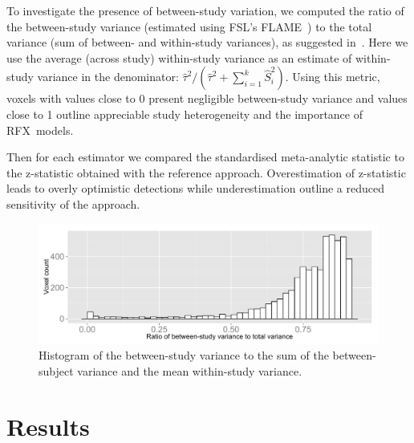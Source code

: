 \documentclass{llncs}
\newcommand{\vareffect}[1][i]{\hat S^2_{#1}}
\newcommand{\nStudies}{k}
\newcommand{\estvarBetween}{\hat\tau^2}
\begin{document}




To investigate the presence of between-study variation, we computed the ratio of the between-study variance (estimated using FSL's FLAME~\cite{Smith2001}) to the total variance (sum of between- and within-study variances), as suggested in~\cite{Chen2012}. Here we use the average (across study) within-study variance as an estimate of within-study variance in the denominator:
$\estvarBetween / (\estvarBetween + \sum_{i=1}^{\nStudies} \vareffect)$.
Using this metric, voxels with values close to 0 present negligible between-study variance and values close to 1 outline appreciable study heterogeneity and the importance of RFX~models.

Then for each estimator we co{}mpared the standardised meta-analytic statistic to the z-statistic obtained with the reference approach. Overestimation of z-statistic leads to overly optimistic detections while underestimation outline a reduced sensitivity of the approach. 

\begin{figure}[t]
	\centering
	\includegraphics[width=0.7\linewidth]{./MICCAI_version/Rplot_ratio_variances.pdf}
	\caption{Histogram of the between-study variance to the sum of the between-subject variance and the mean within-study variance.}
	\label{fig_realdata_variances}
\end{figure}

\section{Results}\label{sec_res}
\end{document}
